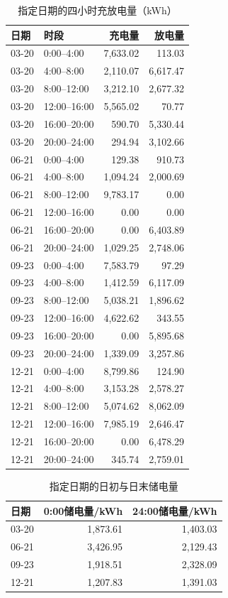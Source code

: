\begin{table}[htbp]
\centering\small
\caption{指定日期的四小时充放电量（kWh）}\label{tab:q3-storage}
\begin{tabular}{llrr}
\toprule
日期 & 时段 & 充电量 & 放电量\\
\midrule
03-20 & 0:00--4:00 & 7,633.02 & 113.03\\
03-20 & 4:00--8:00 & 2,110.07 & 6,617.47\\
03-20 & 8:00--12:00 & 3,212.10 & 2,677.32\\
03-20 & 12:00--16:00 & 5,565.02 & 70.77\\
03-20 & 16:00--20:00 & 590.70 & 5,330.44\\
03-20 & 20:00--24:00 & 294.94 & 3,102.66\\
06-21 & 0:00--4:00 & 129.38 & 910.73\\
06-21 & 4:00--8:00 & 1,094.24 & 2,000.69\\
06-21 & 8:00--12:00 & 9,783.17 & 0.00\\
06-21 & 12:00--16:00 & 0.00 & 0.00\\
06-21 & 16:00--20:00 & 0.00 & 6,403.89\\
06-21 & 20:00--24:00 & 1,029.25 & 2,748.06\\
09-23 & 0:00--4:00 & 7,583.79 & 97.29\\
09-23 & 4:00--8:00 & 1,412.59 & 6,117.09\\
09-23 & 8:00--12:00 & 5,038.21 & 1,896.62\\
09-23 & 12:00--16:00 & 4,622.62 & 343.55\\
09-23 & 16:00--20:00 & 0.00 & 5,895.68\\
09-23 & 20:00--24:00 & 1,339.09 & 3,257.86\\
12-21 & 0:00--4:00 & 8,799.86 & 124.90\\
12-21 & 4:00--8:00 & 3,153.28 & 2,578.27\\
12-21 & 8:00--12:00 & 5,074.62 & 8,062.09\\
12-21 & 12:00--16:00 & 7,985.19 & 2,646.47\\
12-21 & 16:00--20:00 & 0.00 & 6,478.29\\
12-21 & 20:00--24:00 & 345.74 & 2,759.01\\
\bottomrule
\end{tabular}
\end{table}
\begin{table}[htbp]
\centering\small
\caption{指定日期的日初与日末储电量}\label{tab:q3-soc}
\begin{tabular}{lrr}
\toprule
日期 & 0:00储电量/kWh & 24:00储电量/kWh\\
\midrule
03-20 & 1,873.61 & 1,403.03\\
06-21 & 3,426.95 & 2,129.43\\
09-23 & 1,918.51 & 2,328.09\\
12-21 & 1,207.83 & 1,391.03\\
\bottomrule
\end{tabular}
\end{table}
